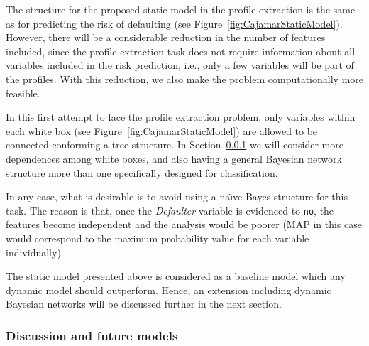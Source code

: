 The structure for the proposed static model in the profile extraction is the same as for predicting the risk of defaulting (see Figure~\ref{fig:CajamarStaticModel}). However, there will be a considerable reduction in the number of features included, since the profile extraction task does not require information about all variables included in the risk prediction, i.e., only a few variables will be part of the profiles. With this reduction, we also make the problem computationally more feasible. 

In this first attempt to face the profile extraction problem, only variables within each white box (see Figure~\ref{fig:CajamarStaticModel}) are allowed to be connected conforming a tree structure. In Section~\ref{subsubsec:CajamarDiscussion} we will consider more dependences among white boxes, and also having a general Bayesian network structure more than one specifically designed for classification. 

In any case, what is desirable is to avoid using a na\"{\i}ve Bayes structure for this task. The reason is that, once the \emph{Defaulter} variable is evidenced to \texttt{no}, the features become independent and the analysis would be poorer (MAP in this case would correspond to the maximum probability value for each variable individually).

The static model presented above is considered as a baseline model which any dynamic model should outperform. Hence, an extension including dynamic Bayesian networks will be discussed further in the next section.


 
\subsubsection{Discussion and future models}\label{subsubsec:CajamarDiscussion}


